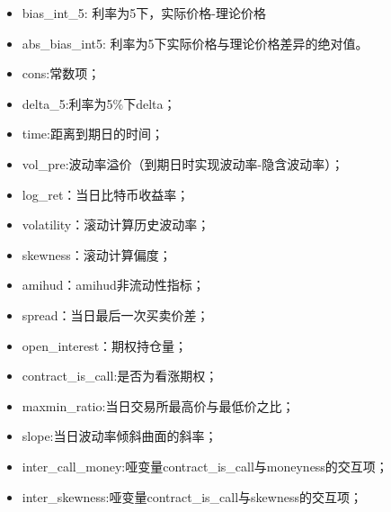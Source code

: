 \documentclass{article}
\begin{document}
    \begin{table}
        
    \end{table}
    \newpage
    \begin{itemize}
        \item bias\_int\_5: 利率为5下，实际价格-理论价格
        \item abs\_bias\_int5: 利率为5下实际价格与理论价格差异的绝对值。
        \item cons:常数项；
        \item delta\_5:利率为5$\%$下delta；
        \item time:距离到期日的时间；
        \item vol\_pre:波动率溢价（到期日时实现波动率-隐含波动率）；
        \item log\_ret：当日比特币收益率；
        \item volatility：滚动计算历史波动率；
        \item skewness：滚动计算偏度；
        \item amihud：amihud非流动性指标；
        \item spread：当日最后一次买卖价差；
        \item open\_interest：期权持仓量；
        \item contract\_is\_call:是否为看涨期权；
        \item maxmin\_ratio:当日交易所最高价与最低价之比；
        \item slope:当日波动率倾斜曲面的斜率；
        \item inter\_call\_money:哑变量contract\_is\_call与moneyness的交互项；
        \item inter\_skewness:哑变量contract\_is\_call与skewness的交互项；
    \end{itemize}

    
\end{document}
